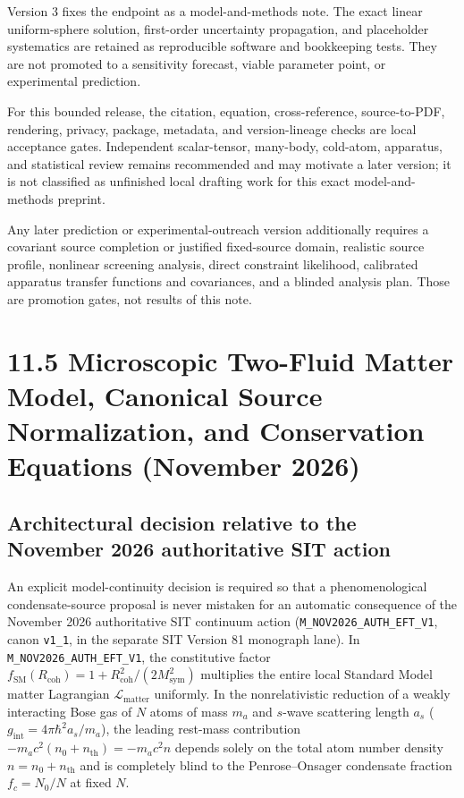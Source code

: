 \documentclass[
  american,
  11pt,
  letterpaper,
]{article}
\begin{document}
Version 3 fixes the endpoint as a model-and-methods note. The exact linear uniform-sphere solution, first-order uncertainty propagation, and placeholder systematics are retained as reproducible software and bookkeeping tests. They are not promoted to a sensitivity forecast, viable parameter point, or experimental prediction.

For this bounded release, the citation, equation, cross-reference, source-to-PDF, rendering, privacy, package, metadata, and version-lineage checks are local acceptance gates. Independent scalar-tensor, many-body, cold-atom, apparatus, and statistical review remains recommended and may motivate a later version; it is not classified as unfinished local drafting work for this exact model-and-methods preprint.

Any later prediction or experimental-outreach version additionally requires a covariant source completion or justified fixed-source domain, realistic source profile, nonlinear screening analysis, direct constraint likelihood, calibrated apparatus transfer functions and covariances, and a blinded analysis plan. Those are promotion gates, not results of this note.

\section{11.5 Microscopic Two-Fluid Matter Model, Canonical Source Normalization, and Conservation Equations (November 2026)}\label{microscopic-two-fluid-matter-model-canonical-source-normalization-and-conservation-equations-november-2026}

\subsection{Architectural decision relative to the November 2026 authoritative SIT action}\label{architectural-decision-relative-to-the-november-2026-authoritative-sit-action}

An explicit model-continuity decision is required so that a phenomenological condensate-source proposal is never mistaken for an automatic consequence of the November 2026 authoritative SIT continuum action (\nolinkurl{M_NOV2026_AUTH_EFT_V1}, canon \texttt{v1\_1}, in the separate SIT Version 81 monograph lane). In \nolinkurl{M_NOV2026_AUTH_EFT_V1}, the constitutive factor \(f_{\mathrm{SM}}(R_{\mathrm{coh}}) = 1 + R_{\mathrm{coh}}^2/(2 M_{\mathrm{sym}}^2)\) multiplies the entire local Standard Model matter Lagrangian \(\mathcal{L}_{\mathrm{matter}}\) uniformly. In the nonrelativistic reduction of a weakly interacting Bose gas of \(N\) atoms of mass \(m_a\) and \(s\)-wave scattering length \(a_s\) (\(g_{\mathrm{int}} = 4\pi\hbar^2 a_s / m_a\)), the leading rest-mass contribution \(-m_a c^2 (n_0 + n_{\mathrm{th}}) = -m_a c^2 n\) depends solely on the total atom number density \(n = n_0 + n_{\mathrm{th}}\) and is completely blind to the Penrose--Onsager condensate fraction \(f_c = N_0/N\) at fixed \(N\).
\end{document}
